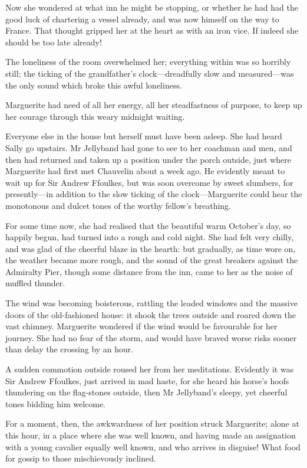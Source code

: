 Now she wondered at what inn he might be stopping, or whether he had had the good luck of chartering a vessel already, and was now himself on the way to France. That thought gripped her at the heart as with an iron vice. If indeed she should be too late already!

The loneliness of the room overwhelmed her; everything within was so horribly still; the ticking of the grandfather's clock—dreadfully slow and measured—was the only sound which broke this awful loneliness.

Marguerite had need of all her energy, all her steadfastness of purpose, to keep up her courage through this weary midnight waiting.

Everyone else in the house but herself must have been asleep. She had heard Sally go upstairs. Mr Jellyband had gone to see to her coachman and men, and then had returned and taken up a position under the porch outside, just where Marguerite had first met Chauvelin about a week ago. He evidently meant to wait up for Sir Andrew Ffoulkes, but was soon overcome by sweet slumbers, for presently—in addition to the slow ticking of the clock—Marguerite could hear the monotonous and dulcet tones of the worthy fellow's breathing.

For some time now, she had realised that the beautiful warm October's day, so happily begun, had turned into a rough and cold night. She had felt very chilly, and was glad of the cheerful blaze in the hearth: but gradually, as time wore on, the weather became more rough, and the sound of the great breakers against the Admiralty Pier, though some distance from the inn, came to her as the noise of muffled thunder.

The wind was becoming boisterous, rattling the leaded windows and the massive doors of the old-fashioned house: it shook the trees outside and roared down the vast chimney. Marguerite wondered if the wind would be favourable for her journey. She had no fear of the storm, and would have braved worse risks sooner than delay the crossing by an hour.

A sudden commotion outside roused her from her meditations. Evidently it was Sir Andrew Ffoulkes, just arrived in mad haste, for she heard his horse's hoofs thundering on the flag-stones outside, then Mr Jellyband's sleepy, yet cheerful tones bidding him welcome.

For a moment, then, the awkwardness of her position struck Marguerite; alone at this hour, in a place where she was well known, and having made an assignation with a young cavalier equally well known, and who arrives in disguise! What food for gossip to those mischievously inclined.

